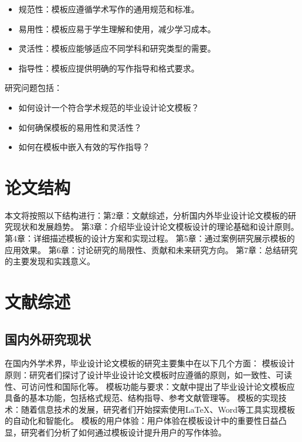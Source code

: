 \documentclass[../main.tex]{subfiles}
\begin{document}
\begin{itemize}
    \item 规范性：模板应遵循学术写作的通用规范和标准。
    \item 易用性：模板应易于学生理解和使用，减少学习成本。
    \item 灵活性：模板应能够适应不同学科和研究类型的需要。
    \item 指导性：模板应提供明确的写作指导和格式要求。
\end{itemize}

研究问题包括：

\begin{itemize}
    \item 如何设计一个符合学术规范的毕业设计论文模板？
    \item 如何确保模板的易用性和灵活性？
    \item 如何在模板中嵌入有效的写作指导？
\end{itemize}

\section{论文结构}

本文将按照以下结构进行：第2章：文献综述，分析国内外毕业设计论文模板的研究现状和发展趋势。
    第3章：介绍毕业设计论文模板设计的理论基础和设计原则。
    第4章：详细描述模板的设计方案和实现过程。
    第5章：通过案例研究展示模板的应用效果。
    第6章：讨论研究的局限性、贡献和未来研究方向。
    第7章：总结研究的主要发现和实践意义。

\section{文献综述}

\subsection{国内外研究现状}

在国内外学术界，毕业设计论文模板的研究主要集中在以下几个方面：
模板设计原则：研究者们探讨了设计毕业设计论文模板时应遵循的原则，如一致性、可读性、可访问性和国际化等。\cite{dubach_compiling_nodate}
    模板功能与要求：文献中提出了毕业设计论文模板应具备的基本功能，包括格式规范、结构指导、参考文献管理等。\cite{auerbach_lime_nodate}
    模板的实现技术：随着信息技术的发展，研究者们开始探索使用LaTeX、Word等工具实现模板的自动化和智能化。\cite{besard_effective_2019}
    模板的用户体验：用户体验在模板设计中的重要性日益凸显，研究者们分析了如何通过模板设计提升用户的写作体验。\cite{faingnaert_flexible_2022}
\end{document}
